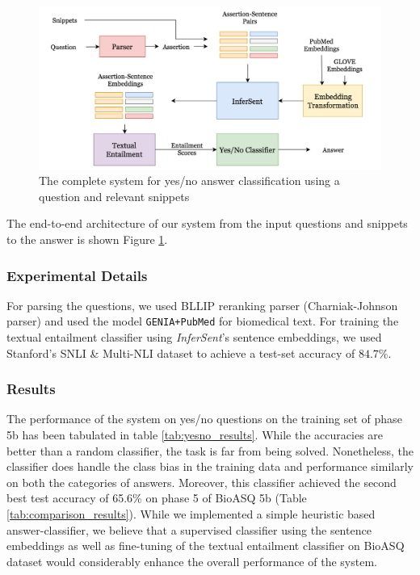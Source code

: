     \begin{figure}[t!]
        \centering
        \includegraphics[scale=0.3]{images/YesNoPipeline.png}
        \caption{The complete system for yes/no answer classification using a question and relevant snippets}
        \label{fig:yesno_pipeline}
    \end{figure}

    The end-to-end architecture of our system from the input questions and snippets to the answer is shown Figure \ref{fig:yesno_pipeline}.
    
\subsubsection{Experimental Details}

For parsing the questions, we used BLLIP reranking parser \cite{charniak_new1} (Charniak-Johnson parser) %
and used the model \texttt{GENIA+PubMed} for biomedical text. For training the textual entailment classifier using \textit{InferSent}'s sentence embeddings, we used Stanford's SNLI \& Multi-NLI dataset \cite{snli} to achieve a test-set accuracy of $84.7 \%$.

\subsubsection{Results}

The performance of the system on yes/no questions on the training set of phase 5b has been tabulated in table \ref{tab:yesno_results}. While the accuracies are better than a random classifier, the task is far from being solved. Nonetheless, the classifier does handle the class bias in the training data and performance similarly on both the categories of answers. Moreover, this classifier achieved the second best test accuracy of 65.6\% on phase 5 of BioASQ 5b (Table \ref{tab:comparison_results}). While we implemented a simple heuristic based answer-classifier, we believe that a supervised classifier using the sentence embeddings as well as fine-tuning of the textual entailment classifier on BioASQ dataset would considerably enhance the overall performance of the system.


